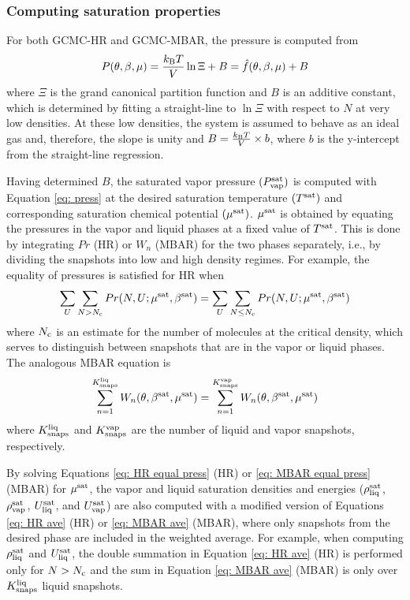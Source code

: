 \documentclass[journal=jced,manuscript=article]{achemso}
\begin{document}
\subsubsection{Computing saturation properties} \label{sec: Saturation}

For both GCMC-HR and GCMC-MBAR, the pressure is computed from
\begin{equation} \label{eq: press}
P(\theta,\beta,\mu) = \frac{k_{\rm B} T}{V} \ln \Xi + B = \hat f(\theta,\beta,\mu) + B
\end{equation}
where $\Xi$ is the grand canonical partition function and $B$ is an additive constant, which is determined by fitting a straight-line to $\ln \Xi$ with respect to $N$ at very low densities. At these low densities, the system is assumed to behave as an ideal gas and, therefore, the slope is unity and $B = \frac{k_{\rm B} T}{V} \times b$, where $b$ is the y-intercept from the straight-line regression.

Having determined $B$, the saturated vapor pressure $(P_{\rm vap}^{\rm sat})$ is computed with Equation \ref{eq: press} at the desired saturation temperature $(T^{\rm sat})$ and corresponding saturation chemical potential $(\mu^{\rm sat})$. $\mu^{\rm sat}$ is obtained by equating the pressures in the vapor and liquid phases at a fixed value of $T^{\rm sat}$. This is done by integrating $Pr$ (HR) or $W_{n}$ (MBAR) for the two phases separately, i.e., by dividing the snapshots into low and high density regimes. For example, the equality of pressures is satisfied for HR when
\begin{eqnarray} \label{eq: HR equal press}
\sum_{U} \sum_{N > N_{\rm c}} Pr(N,U;\mu^{\rm sat},\beta^{\rm sat}) = \sum_{U} \sum_{N \leq N_{\rm c}} Pr(N,U;\mu^{\rm sat},\beta^{\rm sat})
\end{eqnarray}
where $N_{\rm c}$ is an estimate for the number of molecules at the critical density, which serves to distinguish between snapshots that are in the vapor or liquid phases. The analogous MBAR equation is
\begin{eqnarray} \label{eq: MBAR equal press}
\sum_{n=1}^{K^{\rm liq}_{\rm snaps}} W_{n}(\theta,\beta^{\rm sat},\mu^{\rm sat}) = \sum_{n=1}^{K^{\rm vap}_{\rm snaps}} W_{n}(\theta,\beta^{\rm sat},\mu^{\rm sat})
\end{eqnarray}
where $K^{\rm liq}_{\rm snaps}$ and $K^{\rm vap}_{\rm snaps}$ are the number of liquid and vapor snapshots, respectively.

By solving Equations \ref{eq: HR equal press} (HR) or \ref{eq: MBAR equal press} (MBAR) for $\mu^{\rm sat}$, the vapor and liquid saturation densities and energies ($\rho_{\rm liq}^{\rm sat}$, $\rho_{\rm vap}^{\rm sat}$, $U_{\rm liq}^{\rm sat}$, and $U_{\rm vap}^{\rm sat}$) are also computed with a modified version of Equations \ref{eq: HR ave} (HR) or \ref{eq: MBAR ave} (MBAR), where only snapshots from the desired phase are included in the weighted average. For example, when computing $\rho_{\rm liq}^{\rm sat}$ and $U_{\rm liq}^{\rm sat}$, the double summation in Equation \ref{eq: HR ave} (HR) is performed only for $N > N_{\rm c}$ and the sum in Equation \ref{eq: MBAR ave} (MBAR) is only over $K^{\rm liq}_{\rm snaps}$ liquid snapshots.
\end{document}
